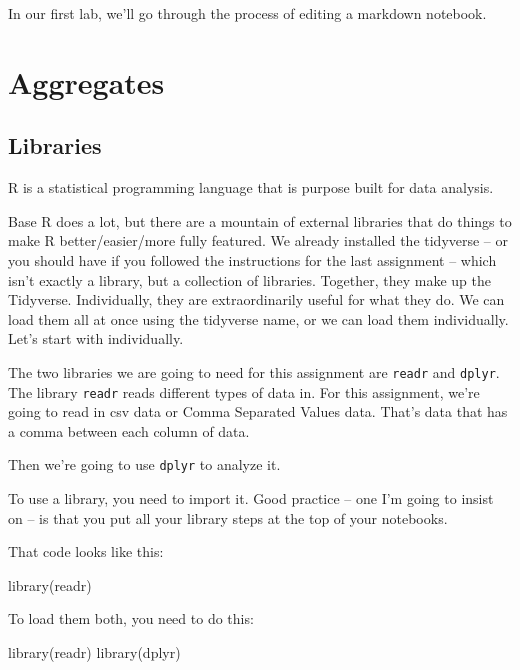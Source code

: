 \documentclass[
  letterpaper,
  DIV=11,
  numbers=noendperiod]{scrreprt}
\newenvironment{Shaded}{\begin{snugshade}}{\end{snugshade}}
\newcommand{\FunctionTok}[1]{\textcolor[rgb]{0.28,0.35,0.67}{#1}}
\newcommand{\NormalTok}[1]{\textcolor[rgb]{0.00,0.23,0.31}{#1}}
\begin{document}
In our first lab, we'll go through the process of editing a markdown
notebook.


\hypertarget{aggregates}{%
\chapter{Aggregates}\label{aggregates}}

\hypertarget{libraries}{%
\section{Libraries}\label{libraries}}

R is a statistical programming language that is purpose built for data
analysis.

Base R does a lot, but there are a mountain of external libraries that
do things to make R better/easier/more fully featured. We already
installed the tidyverse -- or you should have if you followed the
instructions for the last assignment -- which isn't exactly a library,
but a collection of libraries. Together, they make up the Tidyverse.
Individually, they are extraordinarily useful for what they do. We can
load them all at once using the tidyverse name, or we can load them
individually. Let's start with individually.

The two libraries we are going to need for this assignment are
\texttt{readr} and \texttt{dplyr}. The library \texttt{readr} reads
different types of data in. For this assignment, we're going to read in
csv data or Comma Separated Values data. That's data that has a comma
between each column of data.

Then we're going to use \texttt{dplyr} to analyze it.

To use a library, you need to import it. Good practice -- one I'm going
to insist on -- is that you put all your library steps at the top of
your notebooks.

That code looks like this:

\begin{Shaded}
\begin{Highlighting}[]
\FunctionTok{library}\NormalTok{(readr)}
\end{Highlighting}
\end{Shaded}

To load them both, you need to do this:

\begin{Shaded}
\begin{Highlighting}[]
\FunctionTok{library}\NormalTok{(readr)}
\FunctionTok{library}\NormalTok{(dplyr)}
\end{Highlighting}
\end{Shaded}
\end{document}
